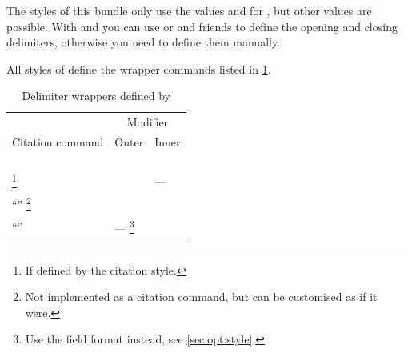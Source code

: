 \documentclass[11pt,a4paper]{article}
\begin{document}
\begin{ltxsyntax}
The styles of this bundle only use the values  and 
for , but other values are possible. With  and
 you can use  or
 and friends to define the opening and closing
delimiters, otherwise you need to define them manually.

All styles of  define the wrapper commands listed in
\cref{tab:delimwrappers}.
\begin{table}[btph]
\centering
\caption{Delimiter wrappers defined by }
\label{tab:delimwrappers}
\begin{minipage}{\linewidth}
\renewcommand\footnoterule{}
\centering
\begin{tabular}{@{}lll@{}}
\toprule
                 & \multicolumn{2}{c}{Modifier} \\
                 \cmidrule(lr){2-3}
Citation command & Outer & Inner\\
\midrule
\cmd{cite} & \cmd{mkoutercitedelims} & \cmd{mkinnercitedelims}\\
\cmd{parencite} & \cmd{mkouterparencitedelims} & \cmd{mkinnerparencitedelims}\\
\cmd{textcite} & \cmd{mkoutertextcitedelims} & \cmd{mkinnertextcitedelims}\\
\cmd{footcite} & \cmd{mkouterfootcitedelims} & \cmd{mkinnerfootcitedelims}\\
\cmd{supercite}\footnote{If defined by the citation style.}
 & \cmd{mkoutersupercitedelims} & ---\\
\enquote{\cmd{bbx@xrefcite}}%
  \footnote{Not implemented as a citation command, but can be
    customised as if it were.}
& \cmd{mkouterbbx@xrefcitedelims} &
  \cmd{mkinnerbbx@xrefcitedelims}\\
\enquote{\cmd{bbx@introcite}} & ---%
    \footnote{Use the field format \bibfieldformat{bbx@introcite} instead,
      see \cref{sec:opt:style}.} & \cmd{mkinnerbbx@introcitedelims}\\
\bottomrule
\end{tabular}
\end{minipage}
\end{table}



\end{ltxsyntax}
\end{document}
